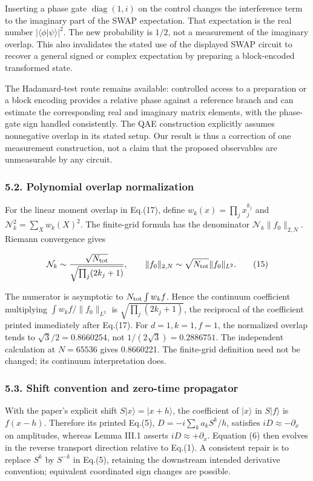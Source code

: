 Inserting a phase gate \(\operatorname{diag}(1,i)\) on the control
changes the interference term to the imaginary part of the SWAP
expectation. That expectation is the real number
\(|\langle\phi|\psi\rangle|^2\). The new probability is \(1/2\), not a
measurement of the imaginary overlap. This also invalidates the stated
use of the displayed SWAP circuit to recover a general signed or complex
expectation by preparing a block-encoded transformed state.

The Hadamard-test route remains available: controlled access to a
preparation or a block encoding provides a relative phase against a
reference branch and can estimate the corresponding real and imaginary
matrix elements, with the phase-gate sign handled consistently. The QAE
construction explicitly assumes nonnegative overlap in its stated setup.
Our result is thus a correction of one measurement construction, not a
claim that the proposed observables are unmeasurable by any circuit.

\subsubsection{5.2. Polynomial overlap
normalization}\label{polynomial-overlap-normalization}

For the linear moment overlap in Eq.(17), define
\(w_k(x)=\prod_j x_j^{k_j}\) and \(\mathcal N_k^2=\sum_Xw_k(X)^2\). The
finite-grid formula has the denominator \(\mathcal N_k\|f_0\|_{2,N}\).
Riemann convergence gives

\[
\mathcal N_k\sim {\sqrt{N_{\rm tot}}\over\sqrt{\prod_j(2k_j+1)}},\qquad
\|f_0\|_{2,N}\sim\sqrt{N_{\rm tot}}\|f_0\|_{L^2}. \tag{15}
\]

The numerator is asymptotic to \(N_{\rm tot}\int w_k f\). Hence the
continuum coefficient multiplying \(\int w_k f/\|f_0\|_{L^2}\) is
\(\sqrt{\prod_j(2k_j+1)}\), the reciprocal of the coefficient printed
immediately after Eq.(17). For \(d=1,k=1,f=1\), the normalized overlap
tends to \(\sqrt3/2=0.8660254\), not \(1/(2\sqrt3)=0.2886751\). The
independent calculation at \(N=65536\) gives 0.8660221. The finite-grid
definition need not be changed; its continuum interpretation does.

\subsubsection{5.3. Shift convention and zero-time
propagator}\label{shift-convention-and-zero-time-propagator}

With the paper's explicit shift \(S|x\rangle=|x+h\rangle\), the
coefficient of \(|x\rangle\) in \(S|f\rangle\) is \(f(x-h)\). Therefore
its printed Eq.(5), \(D=-i\sum_ka_k S^k/h\), satisfies
\(iD\approx-\partial_x\) on amplitudes, whereas Lemma III.1 asserts
\(iD\approx+\partial_x\). Equation (6) then evolves in the reverse
transport direction relative to Eq.(1). A consistent repair is to
replace \(S^k\) by \(S^{-k}\) in Eq.(5), retaining the downstream
intended derivative convention; equivalent coordinated sign changes are
possible.

